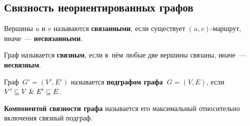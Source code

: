 \subsection{Связность неориентированных графов}
Вершины $u$ и $v$ называются \textbf{связанными}, если существует $(u, v)$-маршрут, иначе~--- \textbf{несвязанными}.

 Граф называется \textbf{связным}, если в~нём любые две вершины связаны, иначе~--- \textbf{несвязным}.

Граф~$G' = (V', E')$ называется \textbf{подграфом графа~$G = (V, E)$}, если $V' \subseteq V \mathrel{\&} E' \subseteq E$.

 \textbf{Компонентой связности графа} называется его максимальный относительно включения связный подграф.